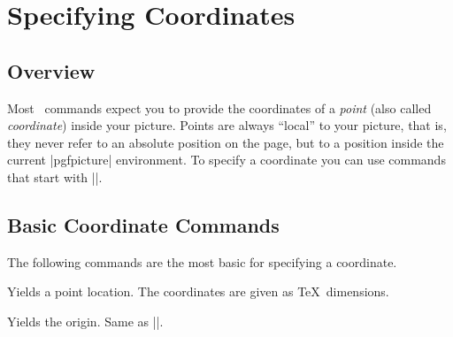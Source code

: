 %
%
%


\section{Specifying Coordinates}
\label{section-points}

\subsection{Overview}

Most \pgfname\ commands expect you to provide the coordinates of a \emph{point}
(also called \emph{coordinate}) inside your picture. Points are always
``local'' to your picture, that is, they never refer to an absolute position on
the page, but to a position inside the current |{pgfpicture}| environment. To
specify a coordinate you can use commands that start with |\pgfpoint|.


\subsection{Basic Coordinate Commands}

The following commands are the most basic  for specifying a coordinate.

\begin{command}{\pgfpoint{}}
    Yields a point location. The coordinates are given as \TeX\ dimensions.
\begin{codeexample}[]
\end{codeexample}
\end{command}

\begin{command}{\pgfpointorigin}
    Yields the origin. Same as |\pgfpoint{0pt}{0pt}|.
\end{command}

